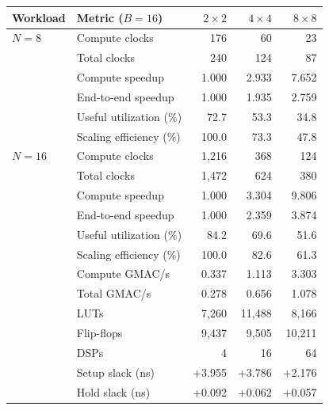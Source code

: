 \begin{tabular}{llrrr}
\toprule
Workload & Metric ($B=16$) & $2\times2$ & $4\times4$ & $8\times8$\\
\midrule
$N=8$ & Compute clocks & 176 & 60 & 23\\
 & Total clocks & 240 & 124 & 87\\
 & Compute speedup & 1.000 & 2.933 & 7.652\\
 & End-to-end speedup & 1.000 & 1.935 & 2.759\\
 & Useful utilization (\%) & 72.7 & 53.3 & 34.8\\
 & Scaling efficiency (\%) & 100.0 & 73.3 & 47.8\\
\midrule
$N=16$ & Compute clocks & 1,216 & 368 & 124\\
 & Total clocks & 1,472 & 624 & 380\\
 & Compute speedup & 1.000 & 3.304 & 9.806\\
 & End-to-end speedup & 1.000 & 2.359 & 3.874\\
 & Useful utilization (\%) & 84.2 & 69.6 & 51.6\\
 & Scaling efficiency (\%) & 100.0 & 82.6 & 61.3\\
 & Compute GMAC/s & 0.337 & 1.113 & 3.303\\
 & Total GMAC/s & 0.278 & 0.656 & 1.078\\
 & LUTs & 7,260 & 11,488 & 8,166\\
 & Flip-flops & 9,437 & 9,505 & 10,211\\
 & DSPs & 4 & 16 & 64\\
 & Setup slack (ns) & +3.955 & +3.786 & +2.176\\
 & Hold slack (ns) & +0.092 & +0.062 & +0.057\\
\bottomrule
\end{tabular}
